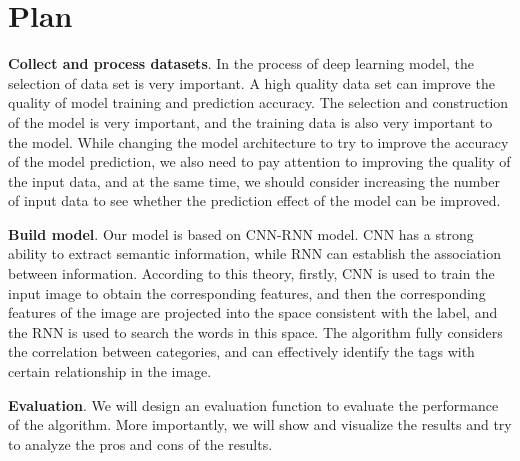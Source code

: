 \documentclass[10pt,twocolumn,letterpaper]{article}
\begin{document}
\section{Plan}
\textbf{Collect and process datasets}\cite{danbooru2019}. In the process of deep learning model, the selection of data set is very important. A high quality data set can improve the quality of model training and prediction accuracy. The selection and construction of the model is very important, and the training data is also very important to the model. While changing the model architecture to try to improve the accuracy of the model prediction, we also need to pay attention to improving the quality of the input data, and at the same time, we should consider increasing the number of input data to see whether the prediction effect of the model can be improved.
\par
\textbf{Build model}. Our model is based on CNN-RNN model. CNN\cite{AlexisVallet2015} has a strong ability to extract semantic information, while RNN can establish the association between information. According to this theory, firstly, CNN is used to train the input image to obtain the corresponding features, and then the corresponding features of the image are projected into the space consistent with the label, and the RNN is used to search the words in this space. The algorithm fully considers the correlation between categories, and can effectively identify the tags with certain relationship in the image.\par

\textbf{Evaluation}. We will design an evaluation function to evaluate the performance of the algorithm. More importantly, we will show and visualize the results and try to analyze the pros and cons of the results.








\end{document}
